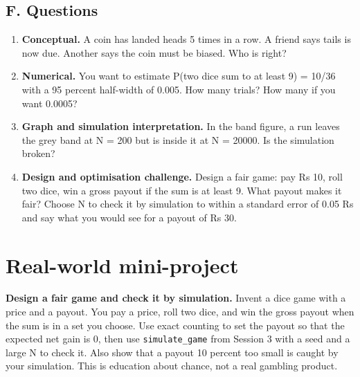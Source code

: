 \documentclass[11pt,a4paper]{article}
\begin{document}
\subsection*{F. Questions}
\begin{enumerate}[nosep]
\item \textbf{Conceptual.} A coin has landed heads 5 times in a row. A friend says tails is now due. Another says the coin must be biased. Who is right?
\item \textbf{Numerical.} You want to estimate P(two dice sum to at least 9) = 10/36 with a 95 percent half-width of 0.005. How many trials? How many if you want 0.0005?
\item \textbf{Graph and simulation interpretation.} In the band figure, a run leaves the grey band at N = 200 but is inside it at N = 20000. Is the simulation broken?
\item \textbf{Design and optimisation challenge.} Design a fair game: pay Rs 10, roll two dice, win a gross payout if the sum is at least 9. What payout makes it fair? Choose N to check it by simulation to within a standard error of 0.05 Rs and say what you would see for a payout of Rs 30.
\end{enumerate}

\section{Real-world mini-project}
\textbf{Design a fair game and check it by simulation.} Invent a dice game with a price and a payout. You pay a price, roll two dice, and win the gross payout when the sum is in a set you choose. Use exact counting to set the payout so that the expected net gain is 0, then use \texttt{simulate\_game} from Session 3 with a seed and a large N to check it. Also show that a payout 10 percent too small is caught by your simulation. This is education about chance, not a real gambling product.
\end{document}
